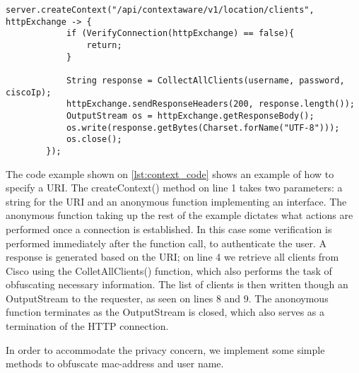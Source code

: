 \begin{lstlisting}[caption={Adding a URI},label={lst:context_code},language=inc_Java]
server.createContext("/api/contextaware/v1/location/clients", httpExchange -> {
            if (VerifyConnection(httpExchange) == false){
                return;
            }

            String response = CollectAllClients(username, password, ciscoIp);
            httpExchange.sendResponseHeaders(200, response.length());
            OutputStream os = httpExchange.getResponseBody();
            os.write(response.getBytes(Charset.forName("UTF-8")));
            os.close();
        });
\end{lstlisting}
The code example shown on \cref{lst:context_code} shows an example of how to specify a URI. The createContext() method on line 1 takes two parameters: a string for the URI and an anonymous function implementing an interface. The anonymous function taking up the rest of the example dictates what actions are performed once a connection is established. In this case some verification is performed immediately after the function call, to authenticate the user. A response is generated based on the URI; on line 4 we retrieve all clients from Cisco using the ColletAllClients() function, which also performs the task of obfuscating necessary information. The list of clients is then written though an OutputStream to the requester, as seen on lines 8 and 9. The anonoymous function terminates as the OutputStream is closed, which also serves as a termination of the HTTP connection. 

In order to accommodate the privacy concern, we implement some simple methods to obfuscate mac-address and user name.  %